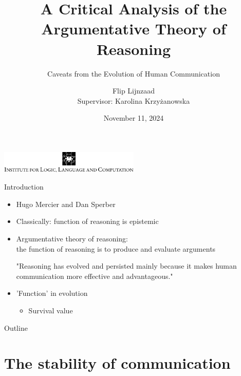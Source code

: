 \documentclass[xcolor=table]{beamer}       %
\title[A Critical Analysis of the ATR]{A Critical Analysis of the Argumentative Theory of Reasoning}
\subtitle{Caveats from the Evolution of Human Communication}
\author[Flip Lijnzaad]{Flip Lijnzaad \\ \small Supervisor: Karolina Krzy\.{z}anowska}
\date{November 11, 2024}
\begin{document}
\begin{frame}{}
    \centering
    \includegraphics[width=0.5\textwidth]{../illclogo.pdf}
    \maketitle
\end{frame}

\begin{frame}{Introduction}
    \begin{itemize}
        \item Hugo Mercier and Dan Sperber
        \item Classically: function of reasoning is epistemic
        \item \alert{Argumentative} theory of reasoning:
            \\ the function of reasoning is to produce and evaluate arguments
    \begin{block}{\citet[p.~60]{MS11}}
        "Reasoning has evolved and persisted mainly because it makes human communication more effective and advantageous."
    \end{block}
    \end{itemize}
    \pause
    \begin{itemize}
        \item 'Function' in evolution \footnotesize{\citep{Ayala99}}
            \begin{itemize}
                \item Survival value
            \end{itemize}
    \end{itemize}
\end{frame}

\begin{frame}{Outline}
    \tableofcontents
\end{frame}

\section{The stability of communication}
\end{document}
